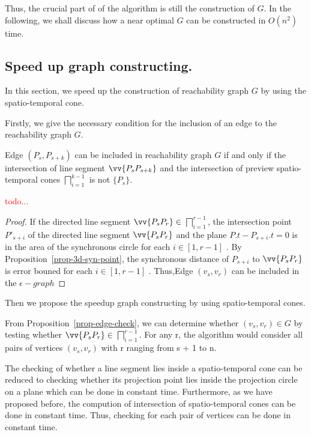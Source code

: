 Thus, the crucial part of of the algorithm is still the construction of $G$. 
In the following, we shall discuss how a near optimal $G$ can be constructed in $O(n^2)$ time.


\subsection{Speed up graph constructing.} %
In this section, we speed up the construction of reachability graph $G$ by using the spatio-temporal cone.

Firstly, we give the necessary condition for the inclusion of an edge to the reachability graph $G$.

\begin{prop}
\label{prop-edge-check}
Edge $(P_{s}, P_{s+k})$ can be included in reachability graph $G$ if and only if the intersection of line segment $\vv{P_{s}P_{s+k}}$ and 
the intersection of preview spatio-temporal cones $\bigsqcap_{i=1}^{k-1}$  is not $\{P_s\}$.
\end{prop}

\textcolor{red}{todo...}  %

\begin{proof}
If the directed line segment $\vv{P_sP_r} \in$ $\bigsqcap_{i=1}^{r-1}$, the
intersection point $P'_{s+i}$ of the directed line segment $\vv{P_sP_r}$ and the
plane $P.t - P_{s+i}.t = 0$  is  in the area of the  synchronous circle
 for each $i \in [1,r - 1]$ . By Proposition~\ref{prop-3d-syn-point}, the
synchronous distance of $P_{s+i}$ to $\vv{P_sP_r}$ is error bouned for each $i \in [1,r - 1]$ . Thus,Edge
$(v_s,v_r)$ can be included in the $\epsilon - graph$  
\end{proof}


Then we propose the speedup graph constructing by using spatio-temporal cones.

From Proposition~\ref{prop-edge-check}, we can determine whether $(v_s,v_r) \in
G$ by testing whether $\vv{P_sP_r} \in $ $\bigsqcap_{i=1}^{r - 1}$. For any r, the algorithm would consider all
pairs of vertices  $(v_s,v_r)$ with  r ranging from s + 1 to n.  

The checking of whether a line segment lies inside a spatio-temporal cone can be
reduced to checking whether its projection point lies inside the projection
circle on a plane which can be done in constant time. Furthermore, as we have
proposed before, the compution of intersection of spatio-temporal cones can be
done in constant time. Thus, checking for each pair of vertices can be done in
constant time.

